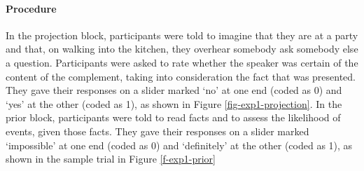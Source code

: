\documentclass[11pt,fleqn]{article}
\newcommand{\6}{\mbox{$[\hspace*{-.6mm}[$}}
\newcommand{\9}{\mbox{$]\hspace*{-.6mm}]$}}
\begin{document}
\paragraph{Procedure} In the projection block, participants were told to imagine that they are at a party and that, on walking into the kitchen, they overhear somebody ask somebody else a question. Participants were asked to rate whether the speaker was certain of the content of the complement, taking into consideration the fact that was presented. They gave their responses on a slider marked `no' at one end (coded as 0) and `yes' at the other (coded as 1), as shown in Figure \ref{fig-exp1-projection}. In the prior block, participants were told to read facts and to assess the likelihood of events, given those facts. They gave their responses on a slider marked `impossible' at one end (coded as 0) and `definitely' at the other (coded as 1), as shown in the sample trial in Figure \ref{f-exp1-prior}
\end{document}
